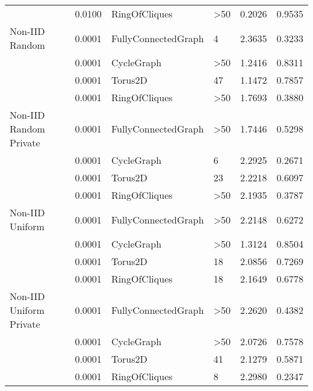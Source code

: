 \begin{tabular}{llllrr}
                        & 0.0100 &        RingOfCliques &         >50 &           0.2026 &              0.9535 \\
Non-IID Random  & 0.0001 &  FullyConnectedGraph &           4 &           2.3635 &              0.3233 \\
                        & 0.0001 &           CycleGraph &         >50 &           1.2416 &              0.8311 \\
                        & 0.0001 &              Torus2D &          47 &           1.1472 &              0.7857 \\
                        & 0.0001 &        RingOfCliques &         >50 &           1.7693 &              0.3880 \\
Non-IID Random Private & 0.0001 &  FullyConnectedGraph &         >50 &           1.7446 &              0.5298 \\
                        & 0.0001 &           CycleGraph &           6 &           2.2925 &              0.2671 \\
                        & 0.0001 &              Torus2D &          23 &           2.2218 &              0.6097 \\
                        & 0.0001 &        RingOfCliques &         >50 &           2.1935 &              0.3787 \\
Non-IID Uniform  & 0.0001 &  FullyConnectedGraph &         >50 &           2.2148 &              0.6272 \\
                        & 0.0001 &           CycleGraph &         >50 &           1.3124 &              0.8504 \\
                        & 0.0001 &              Torus2D &          18 &           2.0856 &              0.7269 \\
                        & 0.0001 &        RingOfCliques &          18 &           2.1649 &              0.6778 \\
Non-IID Uniform Private & 0.0001 &  FullyConnectedGraph &         >50 &           2.2620 &              0.4382 \\
                        & 0.0001 &           CycleGraph &         >50 &           2.0726 &              0.7578 \\
                        & 0.0001 &              Torus2D &          41 &           2.1279 &              0.5871 \\
                        & 0.0001 &        RingOfCliques &           8 &           2.2980 &              0.2347 \\
\bottomrule
\end{tabular}
